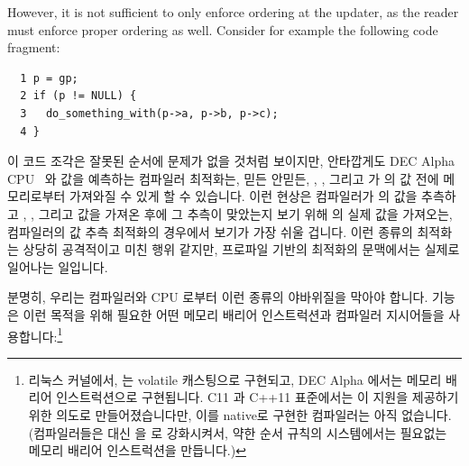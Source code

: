 However, it is not sufficient to only enforce ordering at the
updater, as the reader must enforce proper ordering as well.
Consider for example the following code fragment:
\fi

\vspace{5pt}
\begin{minipage}[t]{\columnwidth}
\scriptsize
\begin{verbatim}
  1 p = gp;
  2 if (p != NULL) {
  3   do_something_with(p->a, p->b, p->c);
  4 }
\end{verbatim}
\end{minipage}
\vspace{5pt}

이 코드 조각은 잘못된 순서에 문제가 없을 것처럼 보이지만, 안타깝게도 DEC Alpha
CPU~\cite{PaulMcKenney2005i,PaulMcKenney2005j} 와 값을 예측하는 컴파일러
최적화는, 믿든 안믿든, , , 그리고  가  의 값
전에 메모리로부터 가져와질 수 있게 할 수 있습니다.
이런 현상은 컴파일러가  의 값을 추측하고 , , 그리고
 값을 가져온 후에 그 추측이 맞았는지 보기 위해  의 실제 값을
가져오는, 컴파일러의 값 추측 최적화의 경우에서 보기가 가장 쉬울 겁니다.
이런 종류의 최적화는 상당히 공격적이고 미친 행위 같지만, 프로파일 기반의
최적화의 문맥에서는 실제로 일어나는 일입니다.

분명히, 우리는 컴파일러와 CPU 로부터 이런 종류의 야바위질을 막아야 합니다.
 기능은 이런 목적을 위해 필요한 어떤 메모리 배리어
인스트럭션과 컴파일러 지시어들을 사용합니다:\footnote{
	리눅스 커널에서,  는 volatile 캐스팅으로
	구현되고, DEC Alpha 에서는 메모리 배리어 인스트럭션으로 구현됩니다.
	C11 과 C++11 표준에서는  이
	 지원을 제공하기 위한 의도로 만들어졌습니다만,
	이를 native로 구현한 컴파일러는 아직 없습니다.
	(컴파일러들은 대신  을
	 로 강화시켜서, 약한 순서 규칙의 시스템에서는
	필요없는 메모리 배리어 인스트럭션을 만듭니다.)}
\iffalse

